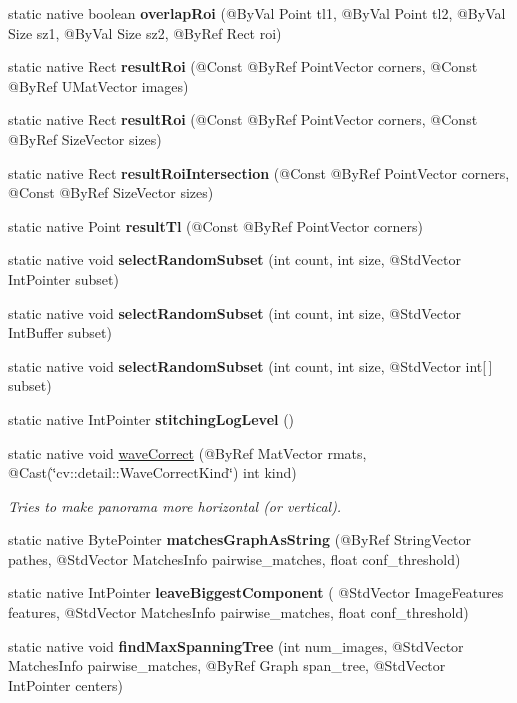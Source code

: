 \begin{DoxyCompactItemize}
\item 
static native boolean {\bfseries overlap\+Roi} (@By\+Val Point tl1, @By\+Val Point tl2, @By\+Val Size sz1, @By\+Val Size sz2, @By\+Ref Rect roi)
\item 
static native Rect {\bfseries result\+Roi} (@Const @By\+Ref Point\+Vector corners, @Const @By\+Ref U\+Mat\+Vector images)
\item 
static native Rect {\bfseries result\+Roi} (@Const @By\+Ref Point\+Vector corners, @Const @By\+Ref Size\+Vector sizes)
\item 
static native Rect {\bfseries result\+Roi\+Intersection} (@Const @By\+Ref Point\+Vector corners, @Const @By\+Ref Size\+Vector sizes)
\item 
static native Point {\bfseries result\+Tl} (@Const @By\+Ref Point\+Vector corners)
\item 
static native void {\bfseries select\+Random\+Subset} (int count, int size, @Std\+Vector Int\+Pointer subset)
\item 
static native void {\bfseries select\+Random\+Subset} (int count, int size, @Std\+Vector Int\+Buffer subset)
\item 
static native void {\bfseries select\+Random\+Subset} (int count, int size, @Std\+Vector int\mbox{[}$\,$\mbox{]} subset)
\item 
static native Int\+Pointer {\bfseries stitching\+Log\+Level} ()
\item 
static native void \hyperlink{group__stitching__rotation_ga3bba1a4cfe47a38f2ef140a3bc6c0f0a}{wave\+Correct} (@By\+Ref Mat\+Vector rmats, @Cast(\char`\"{}cv\+::detail\+::\+Wave\+Correct\+Kind\char`\"{}) int kind)
\begin{DoxyCompactList}\small\item\em Tries to make panorama more horizontal (or vertical). \end{DoxyCompactList}\item 
static native Byte\+Pointer {\bfseries matches\+Graph\+As\+String} (@By\+Ref String\+Vector pathes, @Std\+Vector Matches\+Info pairwise\+\_\+matches, float conf\+\_\+threshold)
\item 
static native Int\+Pointer {\bfseries leave\+Biggest\+Component} ( @Std\+Vector Image\+Features features, @Std\+Vector Matches\+Info pairwise\+\_\+matches, float conf\+\_\+threshold)
\item 
static native void {\bfseries find\+Max\+Spanning\+Tree} (int num\+\_\+images, @Std\+Vector Matches\+Info pairwise\+\_\+matches, @By\+Ref Graph span\+\_\+tree, @Std\+Vector Int\+Pointer centers)

\end{DoxyCompactItemize}
